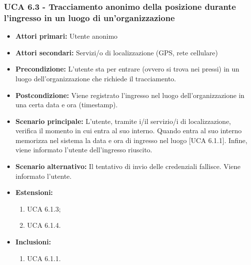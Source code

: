 \subsubsection{UCA 6.3 - Tracciamento anonimo della posizione durante l'ingresso in un luogo di un'organizzazione}
\begin{itemize}
	\item \textbf{Attori primari:} Utente anonimo
	\item \textbf{Attori secondari:} Servizi/o di localizzazione (GPS, rete cellulare)
	\item \textbf{Precondizione:} L'utente sta per entrare (ovvero si trova nei pressi) in un luogo dell'organizzazione che richiede il tracciamento.
	\item \textbf{Postcondizione:} Viene registrato l'ingresso nel luogo dell'organizzazione in una certa data e ora (timestamp).
	\item \textbf{Scenario principale:} L'utente, tramite i/il servizio/i di localizzazione, verifica il momento in cui entra al suo interno. Quando entra al suo interno memorizza nel sistema la data e ora di ingresso nel luogo [UCA 6.1.1]. Infine, viene informato l'utente dell'ingresso riuscito.
	\item \textbf{Scenario alternativo:} Il tentativo di invio delle credenziali fallisce. Viene informato l'utente.
	\item \textbf{Estensioni:}
	\begin{enumerate}
		\item UCA 6.1.3;
		\item UCA 6.1.4.
	\end{enumerate}
	\item \textbf{Inclusioni:}
	\begin{enumerate}
		\item UCA 6.1.1.
	\end{enumerate}
\end{itemize}

